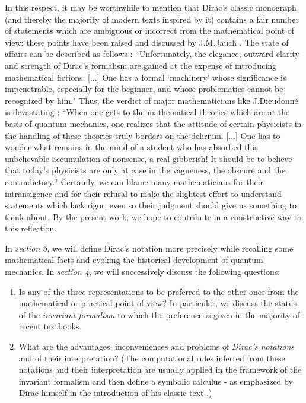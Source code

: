 \documentclass[12pt]{report}
\begin{document}
In this respect, it may be worthwhile to mention that 
Dirac's classic monograph \cite{d} (and thereby the majority of 
modern texts inspired by it) contains a fair number of 
statements which are ambiguous or incorrect from the 
mathematical point of view: these points have been 
raised and discussed by J.M.Jauch \cite{jau}.
The state of affairs can be described as follows \cite{grau}: 
``Unfortunately, the elegance, outward clarity and strength of Dirac's
formalism  are  gained at the expense of introducing 
mathematical fictions. [...] One has a formal 
`machinery' 
whose significance is impenetrable, especially for the beginner, 
and whose problematics cannot be recognized by him." 
Thus, the verdict of major mathematicians like J.Dieudonn\'e
is devastating \cite{dieu}:
``When one gets to the mathematical theories which are at the 
basis of quantum mechanics, one realizes that the attitude of certain 
physicists in the handling of these theories truly 
borders on the delirium. [...] 
One has to wonder what remains in the mind of a student 
who has absorbed this unbelievable accumulation of nonsense,
a real gibberish! It should be to believe that today's 
physicists are only at ease in the vagueness, the obscure and 
the contradictory."
Certainly, we can blame many mathematicians for their 
intransigence and for their refusal to make the slightest 
effort to understand statements which lack rigor, 
 even so their judgment should give us something to think about.
By the present work,   
we hope to contribute in a constructive 
way to this  reflection.

In {\em section 3}, we will define Dirac's notation
more precisely while recalling some mathematical facts 
and evoking the historical development of 
quantum mechanics. 
In {\em section 4}, we will successively discuss
the following questions:
 
\begin{enumerate}
\item
 
Is any of the three representations to be preferred to the other
ones from the mathematical or practical point of view?
In particular, we discuss the status of the {\em invariant formalism}
to which the preference is given in the majority of recent
textbooks.
\item
What are the advantages, inconveniences and problems
of {\em Dirac's notations} and of their interpretation?
(The computational rules inferred from these notations and 
their interpretation are usually applied in the framework 
of the invariant formalism and then define a symbolic 
calculus - as emphasized by Dirac himself 
in the introduction of his classic text \cite{d}.) 

\end{enumerate}
 
\end{document}
